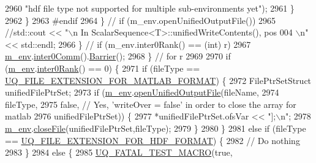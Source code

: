 \begin{DoxyCode}
2960                                   \textcolor{stringliteral}{"hdf file type not supported for multiple sub-environments yet"});
2961             \}
2962           \}
2963 \textcolor{preprocessor}{#endif}
2964 \textcolor{preprocessor}{}        \} \textcolor{comment}{// if (m\_env.openUnifiedOutputFile())}
2965         \textcolor{comment}{//std::cout << "\(\backslash\)n In ScalarSequence<T>::unifiedWriteContents(), pos 004 \(\backslash\)n" << std::endl;}
2966       \} \textcolor{comment}{// if (m\_env.inter0Rank() == (int) r)}
2967       \hyperlink{class_q_u_e_s_o_1_1_scalar_sequence_a71618cd6351b29361b437af68447a4c8}{m\_env}.\hyperlink{class_q_u_e_s_o_1_1_base_environment_a689e4d140c74d495d97eb498714a4b82}{inter0Comm}().\hyperlink{class_q_u_e_s_o_1_1_mpi_comm_a4059971c30e023b272fccaa6aa00c426}{Barrier}();
2968     \} \textcolor{comment}{// for r}
2969 
2970     \textcolor{keywordflow}{if} (\hyperlink{class_q_u_e_s_o_1_1_scalar_sequence_a71618cd6351b29361b437af68447a4c8}{m\_env}.\hyperlink{class_q_u_e_s_o_1_1_base_environment_ae106b5bb8a80b655b88b3a26b1e7c185}{inter0Rank}() == 0) \{
2971       \textcolor{keywordflow}{if} (fileType == \hyperlink{_defines_8h_ac440026eff7deb1c1eed1eea0e8e36ba}{UQ\_FILE\_EXTENSION\_FOR\_MATLAB\_FORMAT}) \{
2972         FilePtrSetStruct unifiedFilePtrSet;
2973         \textcolor{keywordflow}{if} (\hyperlink{class_q_u_e_s_o_1_1_scalar_sequence_a71618cd6351b29361b437af68447a4c8}{m\_env}.\hyperlink{class_q_u_e_s_o_1_1_base_environment_ad4dd93dbcb8d2f9ef79af9afaec00aa5}{openUnifiedOutputFile}(fileName,
2974                                         fileType,
2975                                         \textcolor{keyword}{false}, \textcolor{comment}{// Yes, 'writeOver = false' in order to close the array for
       matlab}
2976                                         unifiedFilePtrSet)) \{
2977           *unifiedFilePtrSet.ofsVar << \textcolor{stringliteral}{"];\(\backslash\)n"};
2978           \hyperlink{class_q_u_e_s_o_1_1_scalar_sequence_a71618cd6351b29361b437af68447a4c8}{m\_env}.\hyperlink{class_q_u_e_s_o_1_1_base_environment_ab712bff194ddd91459d4ea8715c77e8b}{closeFile}(unifiedFilePtrSet,fileType);
2979         \}
2980       \}
2981       \textcolor{keywordflow}{else} \textcolor{keywordflow}{if} (fileType == \hyperlink{_defines_8h_a4ebcc075277d031eb97c90b9a45f4493}{UQ\_FILE\_EXTENSION\_FOR\_HDF\_FORMAT}) \{
2982         \textcolor{comment}{// Do nothing}
2983       \}
2984       \textcolor{keywordflow}{else} \{
2985         \hyperlink{_defines_8h_a56d63d18d0a6d45757de47fcc06f574d}{UQ\_FATAL\_TEST\_MACRO}(\textcolor{keyword}{true},

\end{DoxyCode}
